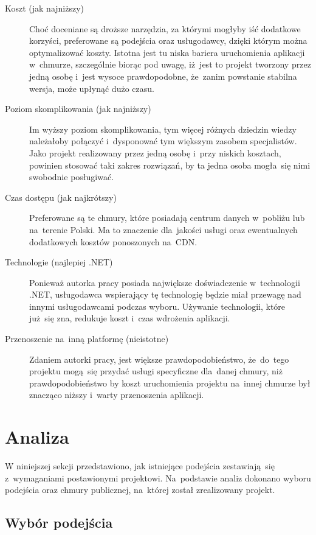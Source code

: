 \documentclass[12pt,a4paper,twoside,titlepage,openright]{book}
\begin{document}
\begin{description}
\item [Koszt (jak najniższy)] Choć doceniane są droższe narzędzia, za którymi mogłyby iść dodatkowe korzyści, preferowane są podejścia oraz usługodawcy, dzięki którym można optymalizować koszty. Istotna jest tu niska bariera uruchomienia aplikacji w~chmurze, szczególnie biorąc pod uwagę, iż~jest to projekt tworzony przez jedną osobę i~jest wysoce prawdopodobne, że~zanim powstanie stabilna wersja, może upłynąć dużo czasu.
\item [Poziom skomplikowania (jak najniższy)] Im wyższy poziom skomplikowania, tym więcej różnych dziedzin wiedzy należałoby połączyć i~dysponować tym większym zasobem specjalistów. Jako projekt realizowany przez jedną osobę i~przy niskich kosztach, powinien stosować taki zakres rozwiązań, by ta jedna osoba mogła~się nimi swobodnie posługiwać.
\item [Czas dostępu (jak najkrótszy)] Preferowane są te chmury, które posiadają centrum danych w~pobliżu lub na~terenie Polski. Ma to znaczenie dla~jakości usługi oraz ewentualnych dodatkowych kosztów ponoszonych na~CDN.
\item [Technologie (najlepiej .NET)] Ponieważ autorka pracy posiada największe doświadczenie w~technologii .NET, usługodawca wspierający tę technologię będzie miał przewagę nad innymi usługodawcami podczas wyboru. Używanie technologii, które już~się zna, redukuje koszt i~czas wdrożenia aplikacji.
\item [Przenoszenie na~inną platformę (nieistotne)] Zdaniem autorki pracy, jest większe prawdopodobieństwo, że~do~tego projektu mogą~się przydać usługi specyficzne dla~danej chmury, niż prawdopodobieństwo by koszt uruchomienia projektu na~innej chmurze był znacząco niższy i~warty przenoszenia aplikacji. 
\end{description}

\section{Analiza}

W niniejszej sekcji przedstawiono, jak istniejące podejścia zestawiają~się z~wymaganiami postawionymi projektowi. Na~podstawie analiz dokonano wyboru podejścia oraz chmury publicznej, na~której został zrealizowany projekt.

\subsection{Wybór podejścia}
\end{document}
